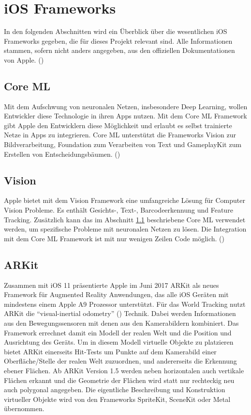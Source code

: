 \section{iOS Frameworks}
In den folgenden Abschnitten wird ein Überblick über die wesentlichen iOS Frameworks gegeben, die für dieses Projekt relevant sind. Alle Informationen stammen, sofern nicht anders angegeben, aus den offiziellen Dokumentationen von Apple. (\cite{apple-developer-doku})


\subsection{Core ML} \label{subsub:core-ml}
Mit dem Aufschwung von neuronalen Netzen, insbesondere Deep Learning, wollen Entwickler diese Technologie in ihren Apps nutzen. Mit dem Core ML Framework gibt Apple den Entwicklern diese Möglichkeit und erlaubt es selbst trainierte Netze in Apps zu integrieren. Core ML unterstützt die Frameworks Vision zur Bildverarbeitung, Foundation zum Verarbeiten von Text und GameplayKit zum Erstellen von Entscheidungsbäumen. (\cite{core-ml})


\subsection{Vision}
Apple bietet mit dem Vision Framework eine umfangreiche Lösung für Computer Vision Probleme. Es enthält Gesichts-, Text-, Barcodeerkennung und Feature Tracking. Zusätzlich kann das im Abschnitt \ref{subsub:core-ml} beschriebene Core ML verwendet werden, um spezifische Probleme mit neuronalen Netzen zu lösen. Die Integration mit dem Core ML Framework ist mit nur wenigen Zeilen Code möglich. (\cite{vision})

\subsection{ARKit}

Zusammen mit iOS 11 präsentierte Apple im Juni 2017 ARKit als neues Framework für Augmented Reality Anwendungen, das alle iOS Geräten mit mindestens einem Apple A9 Prozessor unterstützt. Für das World Tracking nutzt ARKit die "`visual-inertial odometry"' (\cite{arkit-world-tracking}) Technik. Dabei werden Informationen aus den Bewegungssensoren mit denen aus den Kamerabildern kombiniert. Das Framework errechnet damit ein Modell der realen Welt und die Position und Ausrichtung des Geräts. Um in diesem Modell virtuelle Objekte zu platzieren bietet ARKit einerseits Hit-Tests um Punkte auf dem Kamerabild einer Oberfläche/Stelle der realen Welt zuzuordnen, und andererseits die Erkennung ebener Flächen. Ab ARKit Version 1.5 werden neben horizontalen auch vertikale Flächen erkannt und die Geometrie der Flächen wird statt nur rechteckig neu auch polygonal angegeben. Die eigentliche Beschreibung und Konstruktion virtueller Objekte wird von den Frameworks SpriteKit, SceneKit oder Metal übernommen.

